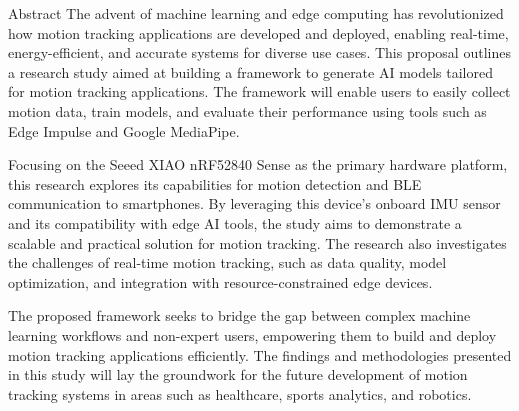 \begin{preface}{Abstract}
  The advent of machine learning and edge computing has revolutionized how motion tracking applications are developed and deployed, enabling real-time, energy-efficient, and accurate systems for diverse use cases. This proposal outlines a research study aimed at building a framework to generate AI models tailored for motion tracking applications. The framework will enable users to easily collect motion data, train models, and evaluate their performance using tools such as Edge Impulse and Google MediaPipe.
  
  Focusing on the Seeed XIAO nRF52840 Sense as the primary hardware platform, this research explores its capabilities for motion detection and BLE communication to smartphones. By leveraging this device's onboard IMU sensor and its compatibility with edge AI tools, the study aims to demonstrate a scalable and practical solution for motion tracking. The research also investigates the challenges of real-time motion tracking, such as data quality, model optimization, and integration with resource-constrained edge devices.
  
  The proposed framework seeks to bridge the gap between complex machine learning workflows and non-expert users, empowering them to build and deploy motion tracking applications efficiently. The findings and methodologies presented in this study will lay the groundwork for the future development of motion tracking systems in areas such as healthcare, sports analytics, and robotics.
\end{preface}
